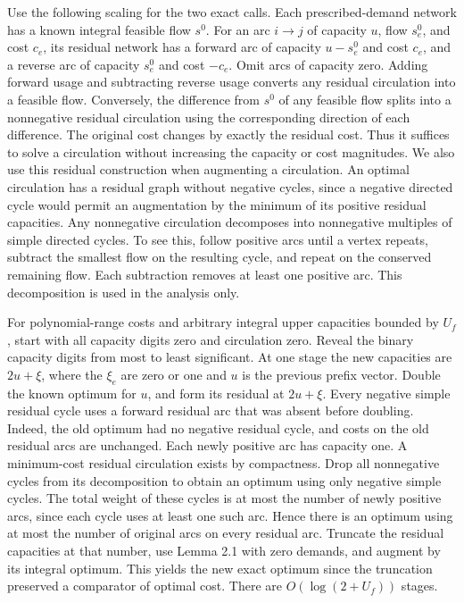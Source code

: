 \documentclass[11pt]{article}
\begin{document}
Use the following scaling for the two exact calls. Each prescribed-demand network has a known integral feasible flow \(s^0\). For an arc \(i\to j\) of capacity \(u\), flow \(s^0_e\), and cost \(c_e\), its residual network has a forward arc of capacity \(u-s^0_e\) and cost \(c_e\), and a reverse arc of capacity \(s^0_e\) and cost \(-c_e\). Omit arcs of capacity zero. Adding forward usage and subtracting reverse usage converts any residual circulation into a feasible flow. Conversely, the difference from \(s^0\) of any feasible flow splits into a nonnegative residual circulation using the corresponding direction of each difference. The original cost changes by exactly the residual cost. Thus it suffices to solve a circulation without increasing the capacity or cost magnitudes. We also use this residual construction when augmenting a circulation. An optimal circulation has a residual graph without negative cycles, since a negative directed cycle would permit an augmentation by the minimum of its positive residual capacities. Any nonnegative circulation decomposes into nonnegative multiples of simple directed cycles. To see this, follow positive arcs until a vertex repeats, subtract the smallest flow on the resulting cycle, and repeat on the conserved remaining flow. Each subtraction removes at least one positive arc. This decomposition is used in the analysis only.

For polynomial-range costs and arbitrary integral upper capacities bounded by \(U_f\), start with all capacity digits zero and circulation zero. Reveal the binary capacity digits from most to least significant. At one stage the new capacities are \(2u+\xi\), where the \(\xi_e\) are zero or one and \(u\) is the previous prefix vector. Double the known optimum for \(u\), and form its residual at \(2u+\xi\). Every negative simple residual cycle uses a forward residual arc that was absent before doubling. Indeed, the old optimum had no negative residual cycle, and costs on the old residual arcs are unchanged. Each newly positive arc has capacity one. A minimum-cost residual circulation exists by compactness. Drop all nonnegative cycles from its decomposition to obtain an optimum using only negative simple cycles. The total weight of these cycles is at most the number of newly positive arcs, since each cycle uses at least one such arc. Hence there is an optimum using at most the number of original arcs on every residual arc. Truncate the residual capacities at that number, use Lemma 2.1 with zero demands, and augment by its integral optimum. This yields the new exact optimum since the truncation preserved a comparator of optimal cost. There are \(O(\log(2+U_f))\) stages.
\end{document}
